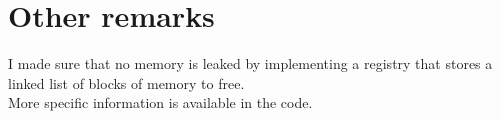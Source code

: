\section{Other remarks}

I made sure that no memory is leaked by implementing a registry
that stores a linked list of blocks of memory to free.\\
More specific information is available in the code.\\

